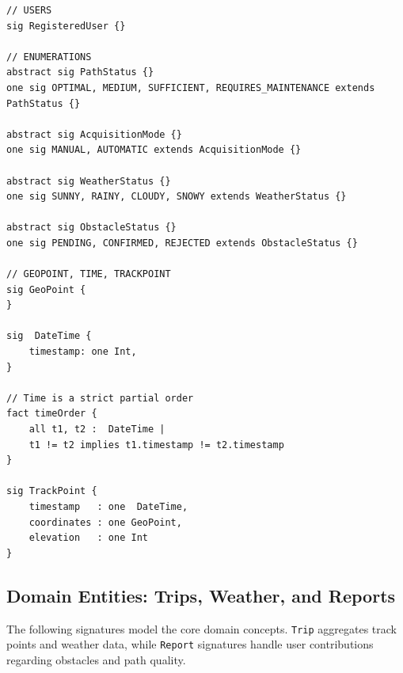 \begin{lstlisting}[language=Alloy]
// USERS
sig RegisteredUser {}

// ENUMERATIONS
abstract sig PathStatus {}
one sig OPTIMAL, MEDIUM, SUFFICIENT, REQUIRES_MAINTENANCE extends PathStatus {}

abstract sig AcquisitionMode {}
one sig MANUAL, AUTOMATIC extends AcquisitionMode {}

abstract sig WeatherStatus {}
one sig SUNNY, RAINY, CLOUDY, SNOWY extends WeatherStatus {}

abstract sig ObstacleStatus {}
one sig PENDING, CONFIRMED, REJECTED extends ObstacleStatus {}

// GEOPOINT, TIME, TRACKPOINT
sig GeoPoint {
}

sig  DateTime {
    timestamp: one Int,
}

// Time is a strict partial order
fact timeOrder {
    all t1, t2 :  DateTime |
    t1 != t2 implies t1.timestamp != t2.timestamp
}

sig TrackPoint {
    timestamp   : one  DateTime,
    coordinates : one GeoPoint,
    elevation   : one Int
}
\end{lstlisting}

\subsection{Domain Entities: Trips, Weather, and Reports}
\par
The following signatures model the core domain concepts. \texttt{Trip} aggregates track points and weather data, while \texttt{Report} signatures handle user contributions regarding obstacles and path quality.


